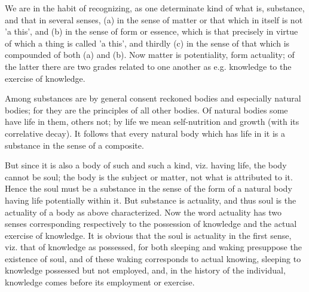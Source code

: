 We are in the habit of recognizing, as one determinate kind of what
is, substance, and that in several senses, (a) in the sense of matter
or that which in itself is not 'a this', and (b) in the sense of form
or essence, which is that precisely in virtue of which a thing is
called 'a this', and thirdly (c) in the sense of that which is compounded
of both (a) and (b). Now matter is potentiality, form actuality; of
the latter there are two grades related to one another as e.g. knowledge
to the exercise of knowledge. 

Among substances are by general consent reckoned bodies and especially
natural bodies; for they are the principles of all other bodies. Of
natural bodies some have life in them, others not; by life we mean
self-nutrition and growth (with its correlative decay). It follows
that every natural body which has life in it is a substance in the
sense of a composite. 

But since it is also a body of such and such a kind, viz. having life,
the body cannot be soul; the body is the subject or matter, not what
is attributed to it. Hence the soul must be a substance in the sense
of the form of a natural body having life potentially within it. But
substance is actuality, and thus soul is the actuality of a body as
above characterized. Now the word actuality has two senses corresponding
respectively to the possession of knowledge and the actual exercise
of knowledge. It is obvious that the soul is actuality in the first
sense, viz. that of knowledge as possessed, for both sleeping and
waking presuppose the existence of soul, and of these waking corresponds
to actual knowing, sleeping to knowledge possessed but not employed,
and, in the history of the individual, knowledge comes before its
employment or exercise. 

